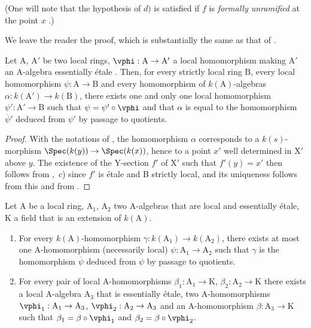 (One will note that the hypothesis of $d)$ is satisfied if $f$ is \emph{formally unramified} at the point $x$ .)

We leave the reader the proof, which is substantially the same as that of .

\begin{lemma}[18.8.4]
\label{IV.18.8.4}
Let $\mathrm{A}$, $\mathrm{A}'$ be two local rings, $\vphi:\mathrm{A}\to\mathrm{A}'$ a local homomorphism making $\mathrm{A}'$ an A-algebra essentially \'{e}tale .
Then, for every strictly local ring $\mathrm{B}$, every local homomorphism $\psi:\mathrm{A}\to\mathrm{B}$ and every homomorphism of $k(\mathrm{A})$-algebras $\alpha:k(\mathrm{A}')\to k(\mathrm{B})$, there exists one and only one local homomorphism $\psi':\mathrm{A}'\to\mathrm{B}$ such that $\psi=\psi'\circ\vphi$ and that $\alpha$ is equal to the homomorphism $\overline{\psi}'$ deduced from $\psi'$ by passage to quotients.
\end{lemma}

\begin{proof}
With the notations of , the homomorphism $\alpha$ corresponds to a $k(s)$-morphism $\Spec(k(y))\to\Spec(k(x))$, hence to a point $x'$ well determined in $\mathrm{X}'$ above $y$.
The existence of the Y-section $f'$ of $\mathrm{X}'$ such that $f'(y)=x'$ then follows from ,~$c$) since $f'$ is \'{e}tale and B strictly local, and its uniqueness follows from this and from .
\end{proof}

\begin{lemma}[18.8.5]
\label{IV.18.8.5}
Let $\mathrm{A}$ be a local ring, $\mathrm{A}_1$, $\mathrm{A}_2$ two A-algebras that are local and essentially \'{e}tale, K a field that is an extension of $k(\mathrm{A})$.
\begin{enumerate}[label=\emph{\roman*)}]
  \item For every $k(\mathrm{A})$-homomorphism $\gamma:k(\mathrm{A}_1)\to k(\mathrm{A}_2)$, there exists at most one A-homomorphism (necessarily local) $\psi:\mathrm{A}_1\to\mathrm{A}_2$ such that $\gamma$ is the homomorphism $\overline{\psi}$ deduced from $\psi$ by passage to quotients.
  \item For every pair of local A-homomorphisms $\beta_1:\mathrm{A}_1\to\mathrm{K}$, $\beta_2:\mathrm{A}_2\to\mathrm{K}$ there exists a local A-algebra $\mathrm{A}_3$ that is essentially \'{e}tale, two A-homomorphisms $\vphi_1:\mathrm{A}_1\to\mathrm{A}_3$, $\vphi_2:\mathrm{A}_2\to\mathrm{A}_3$ and an A-homomorphism $\beta:\mathrm{A}_3\to\mathrm{K}$ such that $\beta_1=\beta\circ\vphi_1$ and $\beta_2=\beta\circ\vphi_2$.
\end{enumerate}
\end{lemma}

